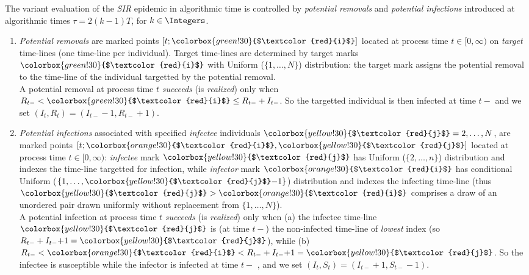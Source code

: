 \documentclass[]{article}
\newcommand{\Population}{N}
\newcommand{\SIR}{\emph{SIR}\xspace}
\newcommand{\target}{{\colorbox{green!30}{$\textcolor{red}{i}$}}}
\newcommand{\infectee}{{\colorbox{yellow!30}{$\textcolor{red}{j}$}}}
\newcommand{\infector}{{\colorbox{orange!30}{$\textcolor{red}{i}$}}}
\begin{document}
\begin{defn}
The variant evaluation of the \SIR epidemic in algorithmic time is controlled by
\label{def:potential}
\emph{potential removals} and \emph{potential infections}
introduced at algorithmic times \(\tau=2(k{-}1)T\),
for \(k\in\Integers\).
\begin{enumerate}[1:]
\item[] \emph{Potential removals}
are marked points \([t;\target]\) located at process time \(t\in[0,\infty)\)
on \emph{target} time-lines (one time-line per individual).
Target time-lines are determined by target marks \(\target\)
with Uniform (\(\{1, \ldots, \Population\}\))
distribution: the target mark assigns the potential removal to 
the time-line of the individual targetted by the potential removal. 
\\
A potential removal at process time \(t\) 
\emph{succeeds} (is \emph{realized}) only when
\(R_{t-}< \target \leq R_{t-}+I_{t-}\).
So
the targetted individual is then infected at time \(t-\) and
we set
\((I_t, R_t) = (I_{t-}{-}1, R_{t-}{+}1)\).
\item[]
\emph{Potential infections} associated with specified \emph{infectee}
individuals \(\infectee=2, \ldots, \Population\), 
are marked points \([t;\infector,\infectee]\) 
located at process time \(t\in[0,\infty)\):
\emph{infectee} mark \(\infectee\) has 
Uniform (\(\{2, \ldots, n\}\))
distribution
and indexes the time-line targetted for infection,
while \emph{infector} mark \(\infector\) has
conditional
Uniform (\(\{1, \ldots, \infectee{-}1\}\)) distribution
and indexes the infecting time-line
(thus \(\infectee>\infector\) comprises a draw of an 
unordered pair drawn uniformly without replacement from \(\{1, \ldots, \Population\}\)).
\\
A potential infection at process time \(t\) 
\emph{succeeds} (is \emph{realized})
only when
(a) the infectee time-line \(\infectee\) is (at time \(t-\)) 
the non-infected time-line of \emph{lowest} index (so \(R_{t-}+I_{t-}{+}1=\infectee\)),
while 
(b) \(R_{t-}<\infector<R_{t-}+I_{t-}{+}1=\infectee\).
So
the infectee is susceptible while the 
infector is infected at time \(t-\) , and we
set
\((I_t,S_t)=(I_{t-}{+}1, S_{t-}{-}1)\).
\end{enumerate}
\end{defn}
\end{document}
